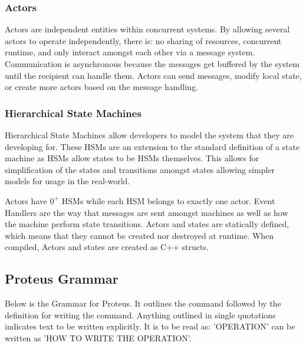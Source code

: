 \subsubsection{Actors}\label{subsubsec:Actors}

Actors are independent entities within concurrent systems.
By allowing several actors to operate independently, there is: no sharing of resources, concurrent runtime, and only interact amongst each other via a message system.
Communication is asynchronous because the messages get buffered by the system until the recipient can handle them.
Actors can send messages, modify local state, or create more actors based on the message handling.

\subsubsection{Hierarchical State Machines}\label{subsubsec:HSM}

Hierarchical State Machines allow developers to model the system that they are developing for.
These HSMs are an extension to the standard definition of a state machine as HSMs allow states to be HSMs themselves.
This allows for simplification of the states and transitions amongst states allowing simpler models for usage in the real-world.

Actors have $0^{+}$ HSMs while each HSM belongs to exactly one actor.
Event Handlers are the way that messages are sent amongst machines as well as how the machine perform state transitions.
Actors and states are statically defined, which means that they cannot be created nor destroyed at runtime.
When compiled, Actors and states are created as C++ structs.

\subsection{Proteus Grammar}\label{subsec:ProteusGrammar}

Below is the Grammar for Proteus.
It outlines the command followed by the definition for writing the command.
Anything outlined in single quotations indicates text to be written explicitly.
It is to be read as: 'OPERATION' can be written as 'HOW TO WRITE THE OPERATION'.

